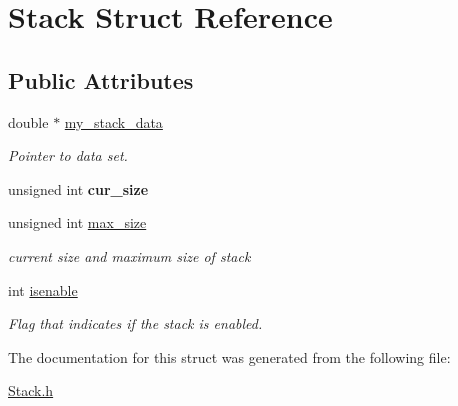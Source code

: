 \hypertarget{structStack}{\section{\-Stack \-Struct \-Reference}
\label{structStack}
}
\subsection*{\-Public \-Attributes}
\begin{DoxyCompactItemize}
\item 
\hypertarget{structStack_a4504e8bc8c1380c3eac8eee467751d5b}{double $\ast$ \hyperlink{structStack_a4504e8bc8c1380c3eac8eee467751d5b}{my\-\_\-stack\-\_\-data}}\label{structStack_a4504e8bc8c1380c3eac8eee467751d5b}

\begin{DoxyCompactList}\small\item\em \-Pointer to data set. \end{DoxyCompactList}\item 
\hypertarget{structStack_a33014d5dcd0a3db739a0ecd207367ac2}{unsigned int {\bfseries cur\-\_\-size}}\label{structStack_a33014d5dcd0a3db739a0ecd207367ac2}

\item 
\hypertarget{structStack_a67360097b9a641e39a5ace138393cf81}{unsigned int \hyperlink{structStack_a67360097b9a641e39a5ace138393cf81}{max\-\_\-size}}\label{structStack_a67360097b9a641e39a5ace138393cf81}

\begin{DoxyCompactList}\small\item\em current size and maximum size of stack \end{DoxyCompactList}\item 
\hypertarget{structStack_acbdc314851b1322ee74f2790ab9fbc36}{int \hyperlink{structStack_acbdc314851b1322ee74f2790ab9fbc36}{isenable}}\label{structStack_acbdc314851b1322ee74f2790ab9fbc36}

\begin{DoxyCompactList}\small\item\em \-Flag that indicates if the stack is enabled. \end{DoxyCompactList}\end{DoxyCompactItemize}


\-The documentation for this struct was generated from the following file\-:\begin{DoxyCompactItemize}
\item 
\hyperlink{Stack_8h}{\-Stack.\-h}\end{DoxyCompactItemize}

